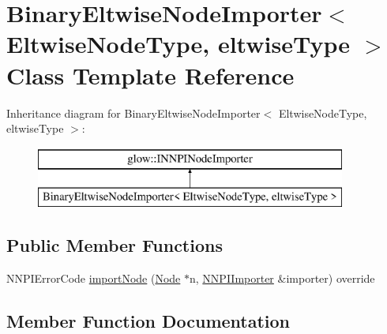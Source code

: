 \hypertarget{class_binary_eltwise_node_importer}{}\section{Binary\+Eltwise\+Node\+Importer$<$ Eltwise\+Node\+Type, eltwise\+Type $>$ Class Template Reference}
\label{class_binary_eltwise_node_importer}
Inheritance diagram for Binary\+Eltwise\+Node\+Importer$<$ Eltwise\+Node\+Type, eltwise\+Type $>$\+:\begin{figure}[H]
\begin{center}
\leavevmode
\includegraphics[height=2.000000cm]{class_binary_eltwise_node_importer}
\end{center}
\end{figure}
\subsection*{Public Member Functions}
\begin{DoxyCompactItemize}
\item 
N\+N\+P\+I\+Error\+Code \hyperlink{class_binary_eltwise_node_importer_a32d09983a182dbdfa8f826575459a081}{import\+Node} (\hyperlink{classglow_1_1_node}{Node} $\ast$n, \hyperlink{classglow_1_1_n_n_p_i_importer}{N\+N\+P\+I\+Importer} \&importer) override
\end{DoxyCompactItemize}


\subsection{Member Function Documentation}
\mbox{\label{class_binary_eltwise_node_importer_a32d09983a182dbdfa8f826575459a081}} 
